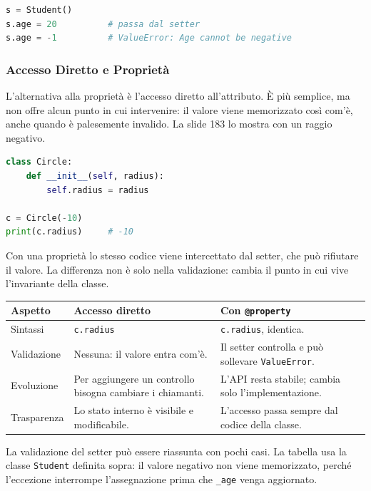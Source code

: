 \documentclass[12pt]{extarticle}
\begin{document}
\begin{lstlisting}[language=Python]
s = Student()
s.age = 20          # passa dal setter
s.age = -1          # ValueError: Age cannot be negative
\end{lstlisting}

\subsubsection{Accesso Diretto e Proprietà}

\noindent L'alternativa alla proprietà è l'accesso diretto all'attributo. È più semplice, ma non offre alcun punto in cui intervenire: il valore viene memorizzato così com'è, anche quando è palesemente invalido. La slide 183 lo mostra con un raggio negativo.

\begin{lstlisting}[language=Python]
class Circle:
    def __init__(self, radius):
        self.radius = radius

c = Circle(-10)
print(c.radius)     # -10
\end{lstlisting}

\noindent Con una proprietà lo stesso codice viene intercettato dal setter, che può rifiutare il valore. La differenza non è solo nella validazione: cambia il punto in cui vive l'invariante della classe.

\begin{center}
\small
\begin{tabular}{p{3.8cm}p{5.0cm}p{5.6cm}}
    \toprule
    \textbf{Aspetto} & \textbf{Accesso diretto} & \textbf{Con \texttt{@property}} \\
    \midrule
    Sintassi & \texttt{c.radius} & \texttt{c.radius}, identica. \\
    \addlinespace
    Validazione & Nessuna: il valore entra com'è. & Il setter controlla e può sollevare \texttt{ValueError}. \\
    \addlinespace
    Evoluzione & Per aggiungere un controllo bisogna cambiare i chiamanti. & L'API resta stabile; cambia solo l'implementazione. \\
    \addlinespace
    Trasparenza & Lo stato interno è visibile e modificabile. & L'accesso passa sempre dal codice della classe. \\
    \bottomrule
\end{tabular}
\end{center}

\noindent La validazione del setter può essere riassunta con pochi casi. La tabella usa la classe \texttt{Student} definita sopra: il valore negativo non viene memorizzato, perché l'eccezione interrompe l'assegnazione prima che \texttt{\_age} venga aggiornato.
\end{document}
